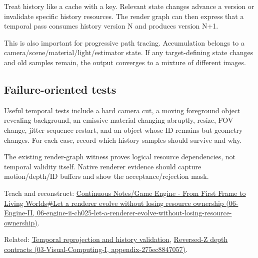 Treat history like a cache with a key. Relevant state changes advance a version or invalidate specific history resources. The render graph can then express that a temporal pass consumes history version N and produces version N+1.

This is also important for progressive path tracing. Accumulation belongs to a camera/scene/material/light/estimator state. If any target-defining state changes and old samples remain, the output converges to a mixture of different images.

\subsection{Failure-oriented tests}\label{appendix-2e7e9fd28a2c-failure-oriented-tests}

Useful temporal tests include a hard camera cut, a moving foreground object revealing background, an emissive material changing abruptly, resize, FOV change, jitter-sequence restart, and an object whose ID remains but geometry changes. For each case, record which history samples should survive and why.

The existing render-graph witness proves logical resource dependencies, not temporal validity itself. Native renderer evidence should capture motion/depth/ID buffers and show the acceptance/rejection mask.

Teach and reconstruct: \href{../06-Engine-II/main.pdf\#nameddest=06-engine-ii-ch025-let-a-renderer-evolve-without-losing-resource-ownership}{Continuous Notes/Game Engine - From First Frame to Living Worlds\#Let a renderer evolve without losing resource ownership (06-Engine-II, 06-engine-ii-ch025-let-a-renderer-evolve-without-losing-resource-ownership)}.

Related: \hyperref[appendix-0727340a4428]{Temporal reprojection and history validation}, \href{../03-Visual-Computing-I/main.pdf\#nameddest=appendix-275ec8847057}{Reversed-Z depth contracts (03-Visual-Computing-I, appendix-275ec8847057)}.
